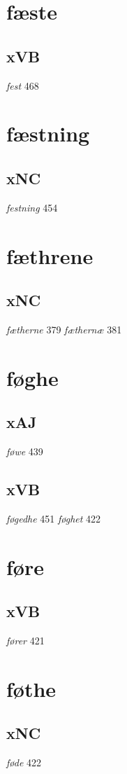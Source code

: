 \documentclass[a4paper,twocolumn]{article}
\begin{document}
\section{fæste}
\label{sec:orgf0014d8}
\subsection{xVB}
\label{sec:org649fb10}
\emph{fest} 468 
\section{fæstning}
\label{sec:orgf262867}
\subsection{xNC}
\label{sec:org5437582}
\emph{festning} 454 
\section{fæthrene}
\label{sec:org407ce78}
\subsection{xNC}
\label{sec:org94199c9}
\emph{fætherne} 379 \emph{fæthernæ} 381 
\section{føghe}
\label{sec:orgbd9547c}
\subsection{xAJ}
\label{sec:org32510e8}
\emph{føwe} 439 
\subsection{xVB}
\label{sec:org81499ed}
\emph{føgedhe} 451 \emph{føghet} 422 
\section{føre}
\label{sec:org5d74ab9}
\subsection{xVB}
\label{sec:orged2d35e}
\emph{fører} 421 
\section{føthe}
\label{sec:org616448e}
\subsection{xNC}
\label{sec:orge6d9c48}
\emph{føde} 422 
\end{document}
